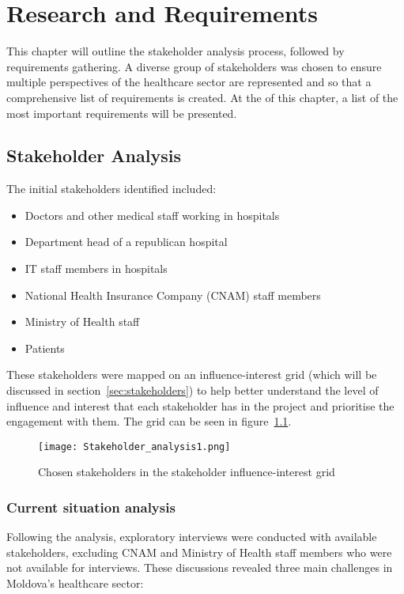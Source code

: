 \chapter{Research and Requirements}

This chapter will outline the stakeholder analysis process, followed by requirements gathering. A diverse group of stakeholders was chosen to ensure multiple perspectives of the healthcare sector are represented and so that a comprehensive list of requirements is created. At the of this chapter, a list of the most important requirements will be presented.

\section{Stakeholder Analysis}

The initial stakeholders identified included:

\begin{itemize}
    \item Doctors and other medical staff working in hospitals
    \item Department head of a republican hospital
    \item IT staff members in hospitals
    \item National Health Insurance Company (CNAM) staff members
    \item Ministry of Health staff
    \item Patients 
\end{itemize}

These stakeholders were mapped on an influence-interest grid (which will be discussed in section~\ref{sec:stakeholders}) to help better understand the level of influence and interest that each stakeholder has in the project and prioritise the engagement with them. The grid can be seen in figure~\ref{fig:stakeholder_analysis1}.

\begin{figure}[ht]
    \centering
    \texttt{[image: Stakeholder\_analysis1.png]}
    \caption{Chosen stakeholders in the stakeholder influence-interest grid}\label{fig:stakeholder_analysis1}
\end{figure}

\subsection{Current situation analysis}

Following the analysis, exploratory interviews were conducted with available stakeholders, excluding CNAM and Ministry of Health staff members who were not available for interviews. These discussions revealed three main challenges in Moldova's healthcare sector:

